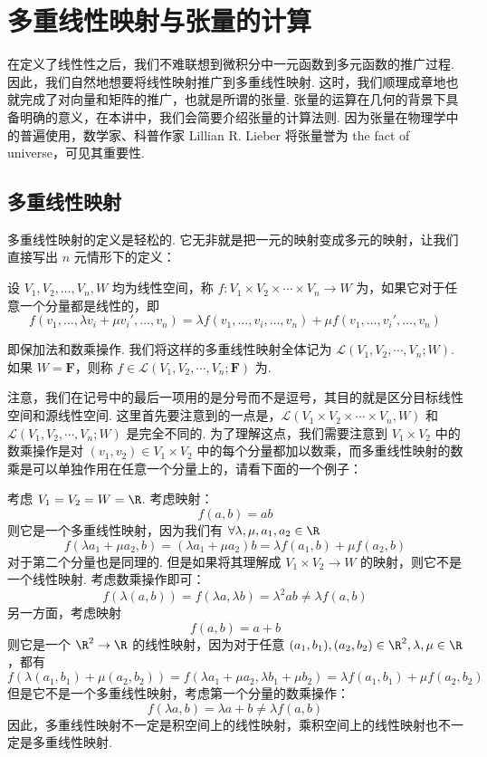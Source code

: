 \chapter{多重线性映射与张量的计算}

在定义了线性性之后，我们不难联想到微积分中一元函数到多元函数的推广过程. 因此，我们自然地想要将线性映射推广到多重线性映射. 这时，我们顺理成章地也就完成了对向量和矩阵的推广，也就是所谓的张量. 张量的运算在几何的背景下具备明确的意义，在本讲中，我们会简要介绍张量的计算法则. 因为张量在物理学中的普遍使用，数学家、科普作家 Lillian R. Lieber 将张量誉为 the fact of universe，可见其重要性.

\section{多重线性映射}

多重线性映射的定义是轻松的. 它无非就是把一元的映射变成多元的映射，让我们直接写出 $n$ 元情形下的定义：

\begin{definition}{}{}
    设 $V_1, V_2, \ldots, V_n, W$ 均为线性空间，称 $f: V_1 \times V_2 \times \cdots \times V_n \to W$ 为，如果它对于任意一个分量都是线性的，即
    \[ f(v_1, \ldots, \lambda v_i + \mu v_i', \ldots, v_n) = \lambda f(v_1, \ldots, v_i, \ldots, v_n) + \mu f(v_1, \ldots, v_i', \ldots, v_n) \]

    即保加法和数乘操作. 我们将这样的多重线性映射全体记为 $\mathcal{L}(V_1, V_2, \cdots, V_n; W)$. 如果 $W = \mathbf{F}$，则称 $f \in \mathcal{L}(V_1, V_2, \cdots, V_n; \mathbf{F})$ 为.
\end{definition}

注意，我们在记号中的最后一项用的是分号而不是逗号，其目的就是区分目标线性空间和源线性空间. 这里首先要注意到的一点是，$\mathcal{L}(V_1 \times V_2 \times \cdots \times V_n, W)$ 和 $\mathcal{L}(V_1, V_2, \cdots, V_n; W)$ 是完全不同的. 为了理解这点，我们需要注意到 $V_1 \times V_2$ 中的数乘操作是对 $(v_1,v_2) \in V_1 \times V_2$ 中的每个分量都加以数乘，而多重线性映射的数乘是可以单独作用在任意一个分量上的，请看下面的一个例子：

\begin{example}
    考虑 $V_1 = V_2 = W = \R$. 考虑映射：
    \[
    f(a, b) = ab
    \]
    则它是一个多重线性映射，因为我们有 $\forall \lambda, \mu, a_1, a_2 \in \R$
    \[
    f(\lambda a_1 + \mu a_2, b) = (\lambda a_1 + \mu a_2) b = \lambda f(a_1, b) + \mu f(a_2, b)
    \]
    对于第二个分量也是同理的. 但是如果将其理解成 $V_1 \times V_2 \to W$ 的映射，则它不是一个线性映射. 考虑数乘操作即可：
    \[
    f(\lambda (a, b)) = f(\lambda a, \lambda b) = \lambda^2 ab \neq \lambda f(a, b)
    \]
    另一方面，考虑映射
    \[
    f(a, b) = a + b
    \]
    则它是一个 $\R^2 \to \R$ 的线性映射，因为对于任意 $(a_1, b_1), (a_2, b_2) \in \R^2, \lambda, \mu \in \R$，都有
    \[
    f(\lambda (a_1, b_1) + \mu (a_2, b_2)) = f(\lambda a_1 + \mu a_2, \lambda b_1 + \mu b_2) = \lambda f(a_1, b_1) + \mu f(a_2, b_2)
    \]
    但是它不是一个多重线性映射，考虑第一个分量的数乘操作：
    \[
    f(\lambda a, b) = \lambda a + b \neq \lambda f(a, b)
    \]
    因此，多重线性映射不一定是积空间上的线性映射，乘积空间上的线性映射也不一定是多重线性映射.
\end{example}

